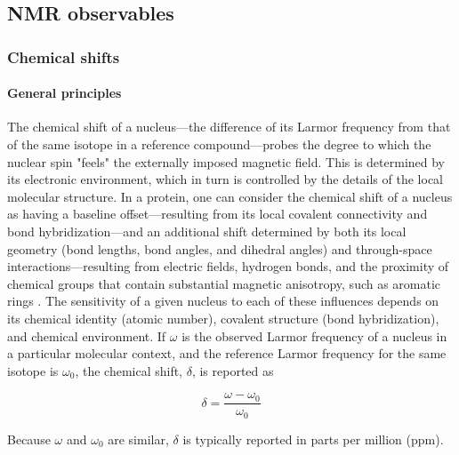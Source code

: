 \documentclass[9pt,review,pubversion]{livecoms}
\begin{document}
\newpage
\subsection{NMR observables}
\label{sub:nmr_obs}

\subsubsection{Chemical shifts}
\label{sub2:chem_shift}

\paragraph{General principles}

The chemical shift of a nucleus---the difference of its Larmor frequency from that of the same isotope in a reference compound---probes the degree to which the nuclear spin "feels" the externally imposed magnetic field.
This is determined by its electronic environment, which in turn is controlled by the details of the local molecular structure.
In a protein, one can consider the chemical shift of a nucleus as having a baseline offset---resulting from its local covalent connectivity and bond hybridization---and an additional shift determined by both its local geometry (bond lengths, bond angles, and dihedral angles) and through-space interactions---resulting from electric fields, hydrogen bonds, and the proximity of chemical groups that contain substantial magnetic anisotropy, such as aromatic rings \cite{wishart_12_1994,wishart_1_2002,neal_rapid_2003}.
The sensitivity of a given nucleus to each of these influences depends on its chemical identity (atomic number), covalent structure (bond hybridization), and chemical environment.
If $\omega$ is the observed Larmor frequency of a nucleus in a particular molecular context, and the reference Larmor frequency for the same isotope is $\omega_0$, the chemical shift, $\delta$, is reported as

\begin{equation}
\label{eqn:chem_shift}
\delta = \frac {\omega - \omega_0} {\omega_0}
\end{equation}

\noindent Because $\omega$ and $\omega_0$ are similar, $\delta$ is typically reported in parts per million (ppm).
\end{document}
